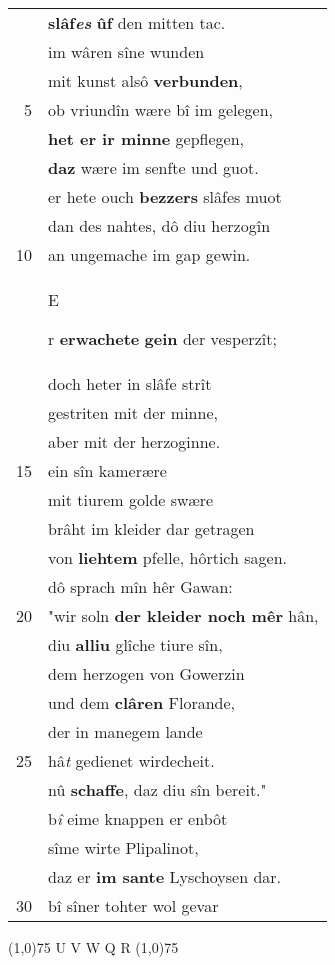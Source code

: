 \documentclass[8pt,a4paper,notitlepage]{article}
\begin{document}
\begin{table}[ht]
\begin{minipage}[t]{0.5\linewidth}
\begin{tabular}{rl}
 & \textbf{slâf\textit{es}} \textbf{ûf} den mitten tac.\\ 
 & im wâren sîne wunden\\ 
 & mit kunst alsô \textbf{verbunden},\\ 
5 & ob vriundîn wære bî im gelegen,\\ 
 & \textbf{het er ir minne} gepflegen,\\ 
 & \textbf{daz} wære im senfte und guot.\\ 
 & er hete ouch \textbf{bezzers} slâfes muot\\ 
 & dan des nahtes, dô diu herzogîn\\ 
10 & an ungemache im gap gewin.\\ 
 & \begin{large}E\end{large}r \textbf{erwachete} \textbf{gein} der vesperzît;\\ 
 & doch heter in slâfe strît\\ 
 & gestriten mit der minne,\\ 
 & aber mit der herzoginne.\\ 
15 & ein sîn kamerære\\ 
 & mit tiurem golde swære\\ 
 & brâht im kleider dar getragen\\ 
 & von \textbf{liehtem} pfelle, hôrtich sagen.\\ 
 & dô sprach mîn hêr Gawan:\\ 
20 & "wir soln \textbf{der kleider noch mêr} hân,\\ 
 & diu \textbf{alliu} glîche tiure sîn,\\ 
 & dem herzogen von Gowerzin\\ 
 & und dem \textbf{clâren} Florande,\\ 
 & der in manegem lande\\ 
25 & hâ\textit{t} gedienet wirdecheit.\\ 
 & nû \textbf{schaffe}, daz diu sîn bereit."\\ 
 & b\textit{î} eime knappen er enbôt\\ 
 & sîme wirte Plipalinot,\\ 
 & daz er \textbf{im sante} Lyschoysen dar.\\ 
30 & bî sîner tohter wol gevar\\ 
\end{tabular}
\scriptsize
\line(1,0){75} \newline
U V W Q R \newline
\line(1,0){75} \newline

\end{minipage}
\end{table}
\end{document}
